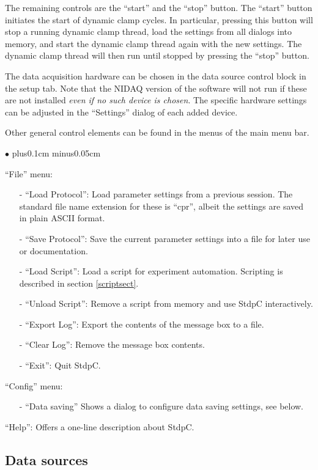 \documentclass{article}
\newenvironment{myitem}{\begin{list}{$\bullet$}{\setlength{\leftmargin}{1.1em}
\itemsep0.1cm plus0.1cm minus0.05cm
\listparindent0cm
\addtolength{\labelsep}{0.5\labelsep}
\setlength{\labelwidth}{0.8em}
\setlength{\leftmargin}{\labelwidth}
\addtolength{\leftmargin}{\labelsep}
}}{\end{list}}
\begin{document}
The remaining controls are the ``start'' and the ``stop'' button.  The
``start'' button initiates the start of dynamic clamp cycles. In
particular, pressing this button will stop a running dynamic clamp
thread, load the settings from all dialogs into memory, and
start the dynamic clamp thread again with the new settings. The
dynamic clamp thread will then run until stopped by pressing the
``stop'' button.

The data acquisition hardware can be chosen in the data source control block in the setup tab.
Note that the NIDAQ version of the software will not run if these are not installed {\em
  even if no such device is chosen}. The specific hardware
settings can be adjusted in the ``Settings'' dialog of each added device.

Other general control elements can be found in the menus of the main
menu bar. 
\begin{myitem}
\item ``File'' menu:
\
\begin{itemize}
\item[-] ``Load Protocol'': Load parameter settings from a previous
  session. The standard file name extension for these is ``cpr'',
  albeit the settings are saved in plain ASCII format.
\item[-] ``Save Protocol'': Save the current parameter settings into a
  file for later use or documentation.
 \item[-] ``Load Script'': Load a script for experiment
   automation. Scripting is described in section \ref{scriptsect}.
\item[-] ``Unload Script'': Remove a script from memory and use StdpC
  interactively.
\item[-] ``Export Log'': Export the contents of the message box to a
  file.
\item[-] ``Clear Log'': Remove the message box contents.
\item[-] ``Exit'': Quit StdpC.
\end{itemize}
\item ``Config'' menu:
\begin{itemize}
\item[-] ``Data saving'' Shows a dialog to configure data saving
  settings, see below.
\end{itemize}
\item ``Help'': Offers a one-line description about StdpC. 
\end{myitem}


\subsection{Data sources}
\end{document}
